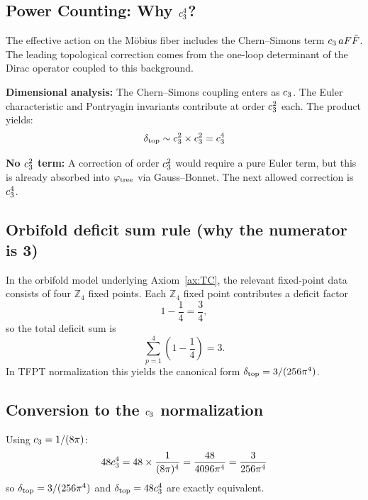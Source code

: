 \subsection{Power Counting: Why $c_3^4$?}

The effective action on the M\"obius fiber includes the Chern--Simons term 
$c_3\, a F\tilde{F}$. The leading topological correction comes from the 
one-loop determinant of the Dirac operator coupled to this background.

\textbf{Dimensional analysis:} The Chern--Simons coupling enters as $c_3$. The 
Euler characteristic and Pontryagin invariants contribute at order $c_3^2$ each. 
The product yields:
\begin{equation}
    \delta_{\mathrm{top}} \sim c_3^2 \times c_3^2 = c_3^4
\end{equation}

\textbf{No $c_3^2$ term:} A correction of order $c_3^2$ would require a 
pure Euler term, but this is already absorbed into $\varphi_{\mathrm{tree}}$ via Gauss--Bonnet. 
The next allowed correction is $c_3^4$.

\subsection{Orbifold deficit sum rule (why the numerator is 3)}

In the orbifold model underlying Axiom~\ref{ax:TC}, the relevant fixed-point data consists of four 
$\mathbb{Z}_4$ fixed points. Each $\mathbb{Z}_4$ fixed point contributes a deficit factor
\begin{equation}
    1-\frac{1}{4}=\frac{3}{4},
\end{equation}
so the total deficit sum is
\begin{equation}
    \sum_{p=1}^{4}\left(1-\frac{1}{4}\right)=3.
\end{equation}
In TFPT normalization this yields the canonical form $\delta_{\mathrm{top}} = 3/(256\pi^4)$.

\subsection{Conversion to the $c_3$ normalization}

Using $c_3 = 1/(8\pi)$:
\begin{equation}
    48c_3^4 = 48 \times \frac{1}{(8\pi)^4} 
    = \frac{48}{4096\pi^4}
    = \frac{3}{256\pi^4}
\end{equation}
so $\delta_{\mathrm{top}} = 3/(256\pi^4)$ and $\delta_{\mathrm{top}} = 48c_3^4$ are exactly equivalent.

